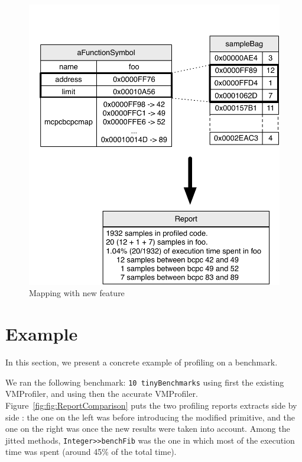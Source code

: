 \documentclass[10pt,preprint,nonatbib]{sigplanconf}
\newcommand{\ct}{\lstinline[backgroundcolor=\color{white},basicstyle=\small\ttfamily]}
\newcommand{\figref}[1]{Figure~\ref{fig:#1}}
\begin{document}
 \begin{figure}[!htp]
     \begin{center}
         \includegraphics[width=1.0\linewidth]{NewMapping}
         \caption{Mapping with new feature}
         \label{fig:NewMapping}
     \end{center}
 \end{figure}
 

\section{Example}

In this section, we present a concrete example of profiling on a benchmark.

We ran the following benchmark: \ct{10 tinyBenchmarks} using first the existing VMProfiler, and using then the accurate VMProfiler. 
\figref{fig:ReportComparison} puts the two  profiling reports extracts side by side : the one on the left was before introducing the modified primitive, and the one on the right was once the new results were taken into account.
Among the jitted methods, \ct{Integer>>benchFib} was the one in which most of the execution time was spent (around 45\% of the total time).
\end{document}
